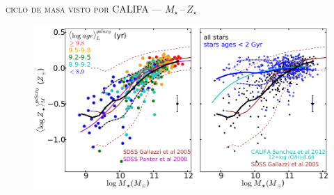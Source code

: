 \documentclass[xcolor=dvipsnames,4pt,fleqn,hyperref={colorlinks,citecolor=black,linkcolor=black,urlcolor=black}]{beamer}
\begin{document}
\begin{frame}{\textsc{ciclo de masa visto por CALIFA --- $M_\star\,$--$\,Z_\star$}}

\begin{figure}
\flushright\citep{Gonzalez2014b}
\includegraphics[scale=0.7]{img/gonzalez2014b-1}
\end{figure}
\end{frame}
\end{document}
